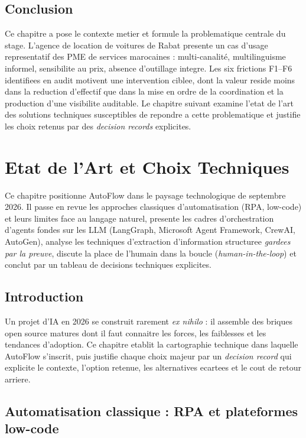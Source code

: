 \documentclass[12pt,a4paper,openany]{report}
\begin{document}
\section{Conclusion}

Ce chapitre a pose le contexte metier et formule la problematique centrale du stage. L'agence de location de voitures de Rabat presente un cas d'usage representatif des PME de services marocaines : multi-canalité, multilinguisme informel, sensibilite au prix, absence d'outillage integre. Les six frictions F1--F6 identifiees en audit motivent une intervention ciblee, dont la valeur reside moins dans la reduction d'effectif que dans la mise en ordre de la coordination et la production d'une visibilite auditable. Le chapitre suivant examine l'etat de l'art des solutions techniques susceptibles de repondre a cette problematique et justifie les choix retenus par des \emph{decision records} explicites.

\chapter{Etat de l'Art et Choix Techniques}\label{chap:etat_art}
Ce chapitre positionne AutoFlow dans le paysage technologique de septembre 2026. Il passe en revue les approches classiques d'automatisation (RPA, low-code) et leurs limites face au langage naturel, presente les cadres d'orchestration d'agents fondes sur les LLM (LangGraph, Microsoft Agent Framework, CrewAI, AutoGen), analyse les techniques d'extraction d'information structuree \emph{gardees par la preuve}, discute la place de l'humain dans la boucle (\emph{human-in-the-loop}) et conclut par un tableau de decisions techniques explicites.

\section{Introduction}
Un projet d'IA en 2026 se construit rarement \emph{ex nihilo} : il assemble des briques open source matures dont il faut connaitre les forces, les faiblesses et les tendances d'adoption. Ce chapitre etablit la cartographie technique dans laquelle AutoFlow s'inscrit, puis justifie chaque choix majeur par un \emph{decision record} qui explicite le contexte, l'option retenue, les alternatives ecartees et le cout de retour arriere.

\section{Automatisation classique : RPA et plateformes low-code}
\end{document}
